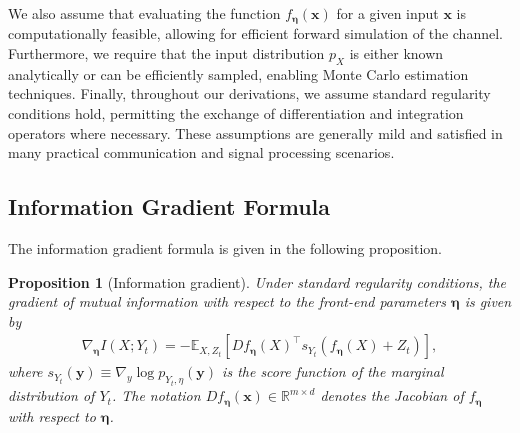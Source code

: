 \documentclass[conference]{IEEEtran}
\newtheorem{proposition}[theorem]{Proposition} %
\newcommand{\R}{\mathbb{R}}
\newcommand{\E}{\mathbb{E}}
\newcommand{\Yt}{Y_t}
\newcommand{\sYt}{s_{\Yt}}
\begin{document}
We also assume that evaluating the function $f_{\bm \eta}(\bm x)$ for a given input $\bm x$ is 
computationally feasible, allowing for efficient forward simulation of the channel. 
Furthermore, we require that the input distribution $p_X$ is either known analytically 
or can be efficiently sampled, enabling Monte Carlo estimation techniques. 
Finally, throughout our derivations, we assume standard regularity conditions hold, 
permitting the exchange of differentiation and integration operators where necessary. 
These assumptions are generally mild and satisfied in many practical communication 
and signal processing scenarios.

\subsection{Information Gradient Formula}
\label{subsec:gradient}

The information gradient formula is given in the following proposition.
\begin{proposition}[Information gradient]
\label{prop:info_gradient}
Under standard regularity conditions, the gradient of mutual information 
with respect to the front-end parameters $\bm \eta$ is given by
\begin{align}
\nabla_{\bm \eta} I(X; \Yt) = -\E_{X,Z_t}\left[D f_{\bm \eta}(X)^\top \sYt(f_{\bm \eta}(X) + Z_t)\right],
\label{eq:gradient_formula}
\end{align}
where $\sYt(\bm y) \equiv \nabla_y \log p_{\Yt,\eta}(\bm y)$ 
is the score function of the marginal distribution of $\Yt$.
The notation $D f_{\bm \eta}(\bm x) \in \R^{m \times d}$ denotes 
the Jacobian of $f_{\bm \eta}$ with respect to $\bm \eta$.
\end{proposition}
\end{document}
